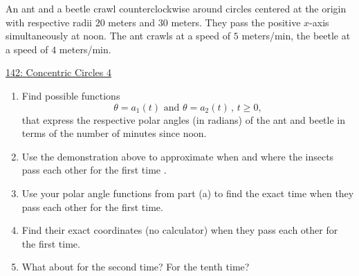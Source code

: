 \documentclass{ximera}
\begin{document}
\begin{question} \label{Q43fgde5r4tggfr}
An ant and a beetle crawl counterclockwise around circles centered at the origin with respective radii $20$ meters and $30$ meters.  They pass the positive $x$-axis simultaneously at noon.  The ant crawls at a speed of $5$ meters/min, the beetle at a speed of $4$ meters/min. 

\begin{onlineOnly}
    \begin{center}
\end{center}
\end{onlineOnly}

\href{https://www.desmos.com/calculator/ie75j2a9ky}{142: Concentric Circles 4}

\begin{enumerate}

\item Find possible functions
\[
   \theta = a_1(t) \text{ and } \theta = a_2(t) \, , \, t\geq 0 ,
\]
that express the respective polar angles (in radians) of the ant and beetle in terms of the number of minutes since noon.

\item Use the demonstration above to approximate when and where the insects pass each other for the first time .

\item Use your polar angle functions from part (a) to find the exact time when they pass each other for the first time.


\item Find their exact coordinates (no calculator) when they pass each other for the first time.

\item What about for the second time? For the tenth time?
\end{enumerate}
\end{question}
\end{document}
